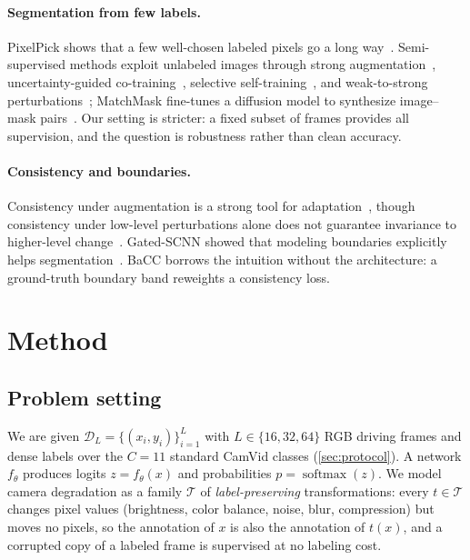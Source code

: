 \documentclass[runningheads]{llncs}
\newcommand{\method}{BaCC}
\begin{document}
\paragraph{Segmentation from few labels.}
PixelPick shows that a few well-chosen labeled pixels go a long
way~\cite{shin2021pixelpick}. Semi-supervised methods exploit unlabeled images
through strong augmentation~\cite{yuan2021simple}, uncertainty-guided
co-training~\cite{fan2022ucc}, selective self-training~\cite{yang2022stpp},
and weak-to-strong perturbations~\cite{yang2023unimatch}; MatchMask fine-tunes
a diffusion model to synthesize image--mask pairs~\cite{lin2026matchmask}. Our
setting is stricter: a fixed subset of frames provides all supervision, and the
question is robustness rather than clean accuracy.

\paragraph{Consistency and boundaries.}
Consistency under augmentation is a strong tool for
adaptation~\cite{araslanov2021augmentation}, though consistency under
low-level perturbations alone does not guarantee invariance to higher-level
change~\cite{lai2021directional}. Gated-SCNN showed that modeling boundaries
explicitly helps segmentation~\cite{takikawa2019gatedscnn}. \method{} borrows
the intuition without the
architecture: a ground-truth boundary band reweights a consistency loss.

\section{Method}

\subsection{Problem setting}

We are given $\mathcal{D}_L=\{(x_i,y_i)\}_{i=1}^{L}$ with
$L\in\{16,32,64\}$ RGB driving frames and dense labels over the $C=11$
standard CamVid classes (\cref{sec:protocol}). A network $f_\theta$ produces
logits $z=f_\theta(x)$ and probabilities $p=\operatorname{softmax}(z)$. We
model camera degradation as a family $\mathcal{T}$ of \emph{label-preserving}
transformations: every $t\in\mathcal{T}$ changes pixel values (brightness,
color balance, noise, blur, compression) but moves no pixels, so the
annotation of $x$ is also the annotation of $t(x)$, and a corrupted copy of a
labeled frame is supervised at no labeling cost.
\end{document}
